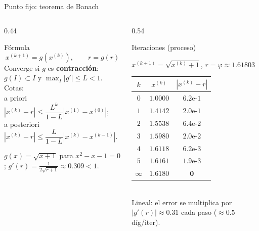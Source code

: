 \documentclass[aspectratio=169,10pt]{beamer}
\begin{document}
\begin{frame}{Punto fijo: teorema de Banach}
\begin{columns}[T]
\begin{column}{0.44\textwidth}
\begin{cardidea}{Fórmula}{\faSuperscript}
$$x^{(k+1)}=g(x^{(k)}),\qquad r=g(r)$$
{\footnotesize Converge si $g$ es \textbf{contracción}: $g(I)\subset I$ y $\max_I|g'|\le L<1$. Cotas:}\\[0.6mm]
{\footnotesize a priori $|x^{(k)}{-}r|\le\dfrac{L^k}{1-L}|x^{(1)}{-}x^{(0)}|$;\\[0.6mm]
a posteriori $|x^{(k)}{-}r|\le\dfrac{L}{1-L}|x^{(k)}{-}x^{(k-1)}|$.}
\end{cardidea}
\vspace{1mm}
\begin{cardnota}[\faInfoCircle]{\footnotesize $g(x)=\sqrt{x+1}$ para $x^2{-}x{-}1{=}0$; $g'(r)=\tfrac{1}{2\sqrt{r+1}}\approx0.309<1$.}\end{cardnota}
\end{column}
\begin{column}{0.54\textwidth}
\begin{cardgear}{Iteraciones (proceso)}{\faTable}
\centering
{\footnotesize $x^{(k+1)}=\sqrt{x^{(k)}+1}$, $r=\varphi\approx1.61803$\\[1mm]
\renewcommand{\arraystretch}{1.2}\setlength{\tabcolsep}{5pt}
\begin{tabular}{c|cc}
$k$ & $x^{(k)}$ & $|x^{(k)}-r|$\\\hline
$0$&$1.0000$&$6.2\text{e-}1$\\
$1$&$1.4142$&$2.0\text{e-}1$\\
$2$&$1.5538$&$6.4\text{e-}2$\\
$3$&$1.5980$&$2.0\text{e-}2$\\
$4$&$1.6118$&$6.2\text{e-}3$\\
$5$&$1.6161$&$1.9\text{e-}3$\\
$\infty$&$\mathbf{1.6180}$&$\mathbf 0$\\
\end{tabular}}\\[1mm]
{\footnotesize Lineal: el error se multiplica por $|g'(r)|\approx0.31$ cada paso ($\approx0.5$ díg/iter).}
\end{cardgear}
\end{column}
\end{columns}
\end{frame}
\end{document}
